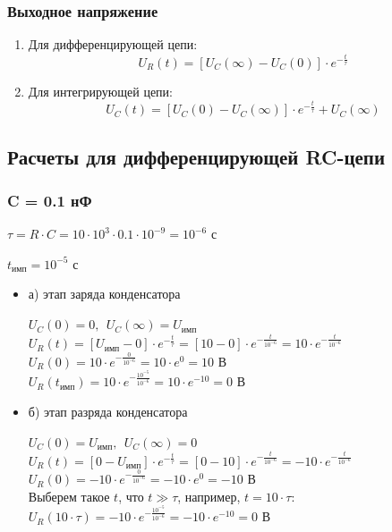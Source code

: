 \documentclass[a4paper,14pt]{extarticle}
\begin{document}
\subsubsection{Выходное напряжение}

\begin{enumerate}
\item Для дифференцирующей цепи:
	\begin{equation}\label{eq:u_r}
	U_R(t) = [U_C(\infty) - U_C(0)] \cdot e^{-\frac{t}{\tau}}
	\end{equation}

\item Для интегрирующей цепи:
	\begin{equation}\label{eq:u_c}
	U_C(t) = [U_C(0) - U_C(\infty)] \cdot e^{-\frac{t}{\tau}} + U_C(\infty)
	\end{equation}
\end{enumerate}

\subsection{Расчеты для дифференцирующей RC-цепи}

\subsubsection{C = 0.1 нФ}

$\tau = R \cdot C = 10 \cdot 10^3 \cdot 0.1 \cdot 10^{-9} = 10^{-6} \text{ с}$

$t_\text{имп} = 10^{-5} \text{ с}$
		
\begin{itemize}
\item[] а) этап заряда конденсатора

	$U_C(0)	= 0,\ \ U_C(\infty) = U_\text{имп}$\\
	$U_R(t) = [U_\text{имп} - 0] \cdot e^{-\frac{t}{\tau}} = [10 - 0] \cdot e^{-\frac{t}{10^{-6}}} = 10 \cdot e^{-\frac{t}{10^{-6}}}$\\
	$U_R(0) = 10 \cdot e^{-\frac{0}{10^{-6}}} = 10 \cdot e^0 = 10 \text{ В}$\\
	$U_R(t_\text{имп}) = 10 \cdot e^{-\frac{10^{-5}}{10^{-6}}} = 10 \cdot e^{-10} = 0 \text{ В}$

\item[] б) этап разряда конденсатора
		
	$U_C(0)	= U_\text{имп},\ \ U_C(\infty) = 0$\\		
	$U_R(t) = [0 - U_\text{имп}] \cdot e^{-\frac{t}{\tau}} = [0 - 10] \cdot e^{-\frac{t}{10^{-6}}} = -10 \cdot e^{-\frac{t}{10^{-6}}}$\\
	$U_R(0) = -10 \cdot e^{-\frac{0}{10^{-6}}} = -10 \cdot e^0 = -10 \text{ В}$\\
	Выберем такое $t$, что $t \gg \tau$, например, $t = 10 \cdot \tau$:\\
	$U_R(10 \cdot \tau) = -10 \cdot e^{-\frac{10^{-5}}{10^{-6}}} = -10 \cdot e^{-10} = 0 \text{ В}$	
\end{itemize}
\end{document}
